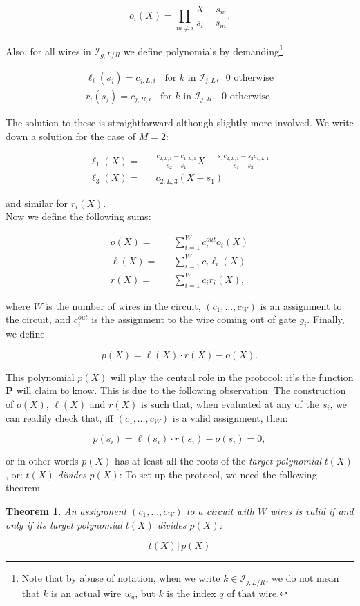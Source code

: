 \documentclass[11pt,oneside]{article}
\newcommand{\bea}{\begin{eqnarray}}
\newcommand{\eea}{\end{eqnarray}}
\newcommand{\be}{\begin{equation}}
\newcommand{\ee}{\end{equation}}
\newcommand{\cI}{\mathcal{I}}
\newcommand{\bP}{\textbf{P} }
\newtheorem{thm}{Theorem}[section]
\theoremstyle{definition}
\theoremstyle{remark}
\numberwithin{equation}{section}
\begin{document}
\be
o_i(X)=\prod\limits_{m\neq i}\frac{X-s_m}{s_i-s_m}.
\ee

Also, for all wires in $\cI_{g,L/R}$ we define polynomials by
demanding\footnote{Note that by abuse of notation, when we write $k\in
\cI_{j,L/R}$, we do not mean that $k$ is an actual wire $w_q$, but $k$ is the
index $q$ of that wire.}

\bea
\ell_i(s_j)=c_{j,L,i}\;\;\text{ for $k$ in } \cI_{j,L},\;\; 0 \text{ otherwise} 
\\
r_i(s_j)=c_{j,R,i}\;\;\text{ for $k$ in } \cI_{j,R},\;\; 0 \text{ otherwise} 
\eea

The solution to these is straightforward although slightly more involved. We
write down a solution for the case of $M=2$:

\bea
\ell_1(X)=&&\frac{c_{2,L,1}-c_{1,L,1}}{s_2-s_1}X+\frac{s_1c_{2,L,1}-s_2c_{1,L,1}}{s_1-s_2}\\
\ell_3(X)=&&c_{2,L,3}(X-s_1)
\eea

and similar for $r_i(X)$.\\
Now we define the following sums:

\bea
o(X)=&&\sum_{i=1}^W c^{out}_i o_i(X)\\
\ell(X)=&&\sum_{i=1}^{W} c_i\ell_i(X)\\
r(X)=&&\sum_{i=1}^{W} c_ir_i(X),
\eea

where $W$ is the number of wires in the circuit, $(c_1,\ldots,c_W)$ is an
assignment to the circuit, and $c_i^{out}$ is the assignment to the wire coming
out of gate $g_i$. Finally, we define

\be
p(X)=\ell(X)\cdot r(X)-o(X).
\ee

This polynomial $p(X)$ will play the central role in the protocol: it's the
function \bP will claim to know. This is due to the following observation: The
construction of $o(X)$, $\ell(X)$ and $r(X)$ is such that, when evaluated at any
of the $s_i$, we can readily check that, iff $(c_1,\ldots,c_W)$ is a valid
assignment, then:

\be
p(s_i)=\ell(s_i)\cdot r(s_i) - o(s_i) =0,
\ee

or in other words $p(X)$ has at least all the roots of the \emph{target
polynomial} $t(X)$, or: $t(X)$ \emph{divides} $p(X)$: To set up the protocol, we
need the following theorem

\begin{thm}
An assignment $(c_1,\ldots,c_W)$ to a circuit with $W$ wires is valid if and
only if its \emph{target polynomial} $t(X)$ divides $p(X)$:

\be
t(X)|\,p(X)
\ee

\end{thm}
\end{document}
